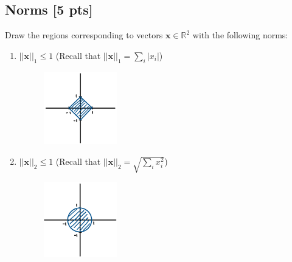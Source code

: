 \documentclass[a4paper]{article}
\theoremstyle{definition}
\newcommand{\RR}{\mathbb{R}}
\newenvironment{soln}{
	\leavevmode\color{blue}\ignorespaces
}{}
\begin{document}
	\subsection{Norms [5 pts]}
	Draw the regions corresponding to vectors $\mathbf{x}\in\RR^2$ with the following norms:
	\begin{enumerate}
		\item 	$||\mathbf{x}||_1\leq 1$ (Recall that $||\mathbf{x}||_1 = \sum_i |x_i|$)

	\begin{soln}
	   \begin{figure}[h!]
	       \centering
	       \includegraphics[width=0.3\textwidth]{images/1-norm.png}  
	       \captionsetup{labelformat=empty}
	       \caption{}
	       \label{fig:1-norm}
	   \end{figure}
	\end{soln}

        \newpage
  
		\item 	$||\mathbf{x}||_2 \leq 1$ (Recall that $||\mathbf{x}||_2 =\sqrt{\sum_i x_i^2}$)
			\begin{soln}
			\begin{figure}[h!]
			    \centering
			    \includegraphics[width=0.3\textwidth]{images/2-norm.png}  
			    \captionsetup{labelformat=empty}
			    \caption{}
			    \label{fig:2-norm}
			\end{figure}
		\end{soln}
  

\end{enumerate}
\end{document}
